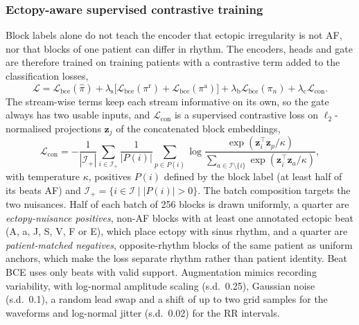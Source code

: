 \documentclass[preprint,12pt]{elsarticle}
\newcommand{\1}{\mathbf{1}}
\begin{document}
\subsubsection{Ectopy-aware supervised contrastive training}
Block labels alone do not teach the encoder that ectopic irregularity is not AF, nor that blocks of one patient can differ in rhythm. The encoders, heads and gate are therefore trained on training patients with a contrastive term added to the classification losses,
\begin{equation}
\mathcal{L}=\mathcal{L}_{\mathrm{bce}}(\hat\pi)+\lambda_{\mathrm s}\bigl[\mathcal{L}_{\mathrm{bce}}(\pi^{\mathrm r})+\mathcal{L}_{\mathrm{bce}}(\pi^{\mathrm a})\bigr]+\lambda_{\mathrm b}\mathcal{L}_{\mathrm{bce}}(\pi_n)+\lambda_{\mathrm c}\mathcal{L}_{\mathrm{con}}.
\label{eq:loss}
\end{equation}
The stream-wise terms keep each stream informative on its own, so the gate always has two usable inputs, and $\mathcal{L}_{\mathrm{con}}$ is a supervised contrastive loss \cite{khosla2020supcon} on $\ell_2$-normalised projections $\bm{z}_j$ of the concatenated block embeddings,
\begin{equation}
\mathcal{L}_{\mathrm{con}}=-\frac{1}{|\mathcal I_+|}\sum_{i\in\mathcal I_+}\frac{1}{|P(i)|}\sum_{p\in P(i)}\log\frac{\exp(\bm{z}_i^{\top}\bm{z}_p/\kappa)}{\sum_{a\in\mathcal{I}\setminus\{i\}}\exp(\bm{z}_i^{\top}\bm{z}_a/\kappa)},
\label{eq:supcon}
\end{equation}
with temperature $\kappa$, positives $P(i)$ defined by the block label (at least half of its beats AF) and $\mathcal I_+=\{i\in\mathcal I\mid|P(i)|>0\}$. The batch composition targets the two nuisances. Half of each batch of 256 blocks is drawn uniformly, a quarter are \emph{ectopy-nuisance positives}, non-AF blocks with at least one annotated ectopic beat (A, a, J, S, V, F or E), which place ectopy with sinus rhythm, and a quarter are \emph{patient-matched negatives}, opposite-rhythm blocks of the same patient as uniform anchors, which make the loss separate rhythm rather than patient identity. Beat BCE uses only beats with valid support. Augmentation mimics recording variability, with log-normal amplitude scaling (s.d.\ 0.25), Gaussian noise (s.d.\ 0.1), a random lead swap and a shift of up to two grid samples for the waveforms and log-normal jitter (s.d.\ 0.02) for the RR intervals.
\end{document}
